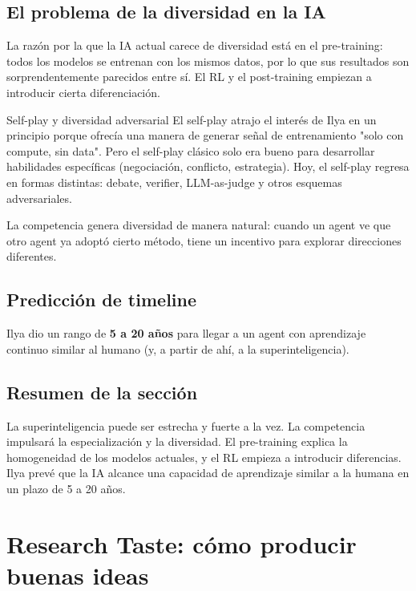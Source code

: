 \documentclass[a4paper]{article}
\begin{document}
\subsection{El problema de la diversidad en la IA}

La razón por la que la IA actual carece de diversidad está en el pre-training: todos los modelos se entrenan con los mismos datos, por lo que sus resultados son sorprendentemente parecidos entre sí. El RL y el post-training empiezan a introducir cierta diferenciación.

\begin{knowledgebox}{Self-play y diversidad adversarial}
El self-play atrajo el interés de Ilya en un principio porque ofrecía una manera de generar señal de entrenamiento "solo con compute, sin data". Pero el self-play clásico solo era bueno para desarrollar habilidades específicas (negociación, conflicto, estrategia). Hoy, el self-play regresa en formas distintas: debate, verifier, LLM-as-judge y otros esquemas adversariales.

La competencia genera diversidad de manera natural: cuando un agent ve que otro agent ya adoptó cierto método, tiene un incentivo para explorar direcciones diferentes.
\end{knowledgebox}

\subsection{Predicción de timeline}

Ilya dio un rango de \textbf{5 a 20 años} para llegar a un agent con aprendizaje continuo similar al humano (y, a partir de ahí, a la superinteligencia).

\subsection{Resumen de la sección}

La superinteligencia puede ser estrecha y fuerte a la vez. La competencia impulsará la especialización y la diversidad. El pre-training explica la homogeneidad de los modelos actuales, y el RL empieza a introducir diferencias. Ilya prevé que la IA alcance una capacidad de aprendizaje similar a la humana en un plazo de 5 a 20 años.

\section{Research Taste: cómo producir buenas ideas}
\end{document}
